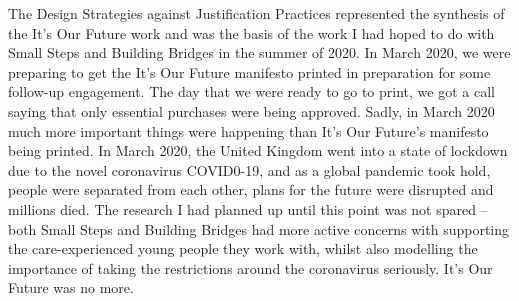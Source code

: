 The Design Strategies against Justification Practices represented the synthesis of the It’s Our Future work and was the basis of the work I had hoped to do with Small Steps and Building Bridges in the summer of 2020. In March 2020, we were preparing to get the It’s Our Future manifesto printed in preparation for some follow-up engagement. The day that we were ready to go to print, we got a call saying that only essential purchases were being approved. Sadly, in March 2020 much more important things were happening than It’s Our Future’s manifesto being printed. In March 2020, the United Kingdom went into a state of lockdown due to the novel coronavirus COVID0-19, and as a global pandemic took hold, people were separated from each other, plans for the future were disrupted and millions died.  The research I had planned up until this point was not spared – both Small Steps and Building Bridges had more active concerns with supporting the care-experienced young people they work with, whilst also modelling the importance of taking the restrictions around the coronavirus seriously. It’s Our Future was no more. 
